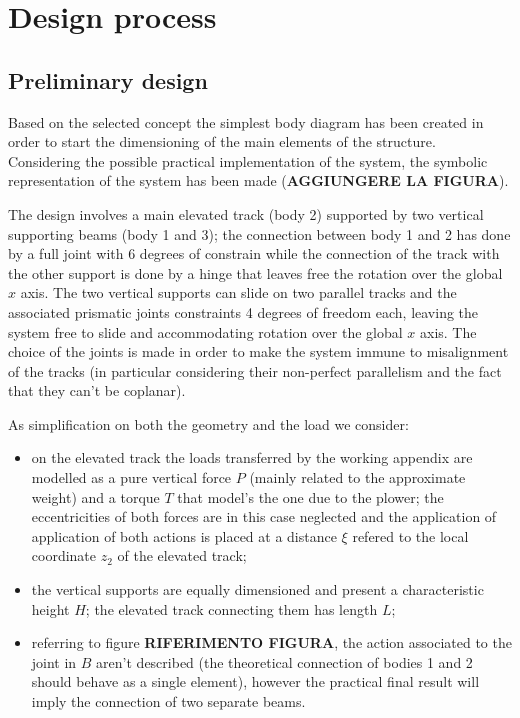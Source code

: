 \section{Design process}
\subsection{Preliminary design}
	Based on the selected concept the simplest body diagram has been created in order to start the dimensioning of the main elements of the structure. Considering the possible practical implementation of the system, the symbolic representation of the system has been made (\textbf{AGGIUNGERE LA FIGURA}).
	
	The design involves a main elevated track (body 2) supported by two vertical supporting beams (body 1 and 3); the connection between body 1 and 2 has done by a full joint with 6 degrees of constrain while the connection of the track with the other support is done by a hinge that leaves free the rotation over the global $x$ axis. The two vertical supports can slide on two parallel tracks and the associated prismatic joints constraints 4 degrees of freedom each, leaving the system free to slide and accommodating rotation over the global $x$ axis. The choice of the joints is made in order to make the system immune to misalignment of the tracks (in particular considering their non-perfect parallelism and the fact that they can't be coplanar).
	
	As simplification on both the geometry and the load we consider:
	\begin{itemize}
		\item on the elevated track the loads transferred by the working appendix are modelled as a pure vertical force $P$ (mainly related to the approximate weight) and a torque $T$ that model's the one due to the plower; the eccentricities of both forces are in this case neglected and the application of application of both actions is placed at a distance $\xi$ refered to the local coordinate $z_2$ of the elevated track;
		
		\item the vertical supports are equally dimensioned and present a characteristic height $H$; the elevated track connecting them has length $L$;
		
		\item referring to figure \textbf{RIFERIMENTO FIGURA}, the action associated to the joint in $B$ aren't described (the theoretical connection of bodies 1 and 2 should behave as a single element), however the practical final result will imply the connection of two separate beams.	
		
	\end{itemize}

